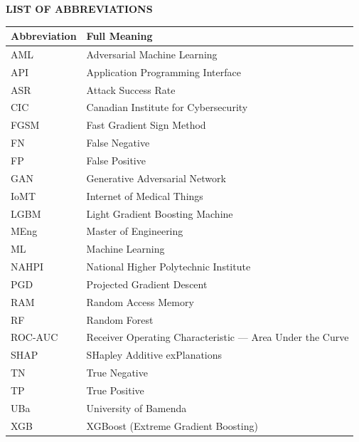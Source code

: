 \documentclass[12pt,a4paper,oneside]{report}
\begin{document}
\thispagestyle{empty}
\begin{center}
    {\Large\bfseries LIST OF ABBREVIATIONS}
\end{center}
\vspace{0.5cm}

\begin{longtable}{p{4cm} p{10cm}}
\textbf{Abbreviation} & \textbf{Full Meaning} \\
\midrule
\endhead
AML    & Adversarial Machine Learning \\
API    & Application Programming Interface \\
ASR    & Attack Success Rate \\
CIC    & Canadian Institute for Cybersecurity \\
FGSM   & Fast Gradient Sign Method \\
FN     & False Negative \\
FP     & False Positive \\
GAN    & Generative Adversarial Network \\
IoMT   & Internet of Medical Things \\
LGBM   & Light Gradient Boosting Machine \\
MEng   & Master of Engineering \\
ML     & Machine Learning \\
NAHPI  & National Higher Polytechnic Institute \\
PGD    & Projected Gradient Descent \\
RAM    & Random Access Memory \\
RF     & Random Forest \\
ROC-AUC & Receiver Operating Characteristic --- Area Under the Curve \\
SHAP   & SHapley Additive exPlanations \\
TN     & True Negative \\
TP     & True Positive \\
UBa    & University of Bamenda \\
XGB    & XGBoost (Extreme Gradient Boosting) \\
\end{longtable}
\newpage


\end{document}
